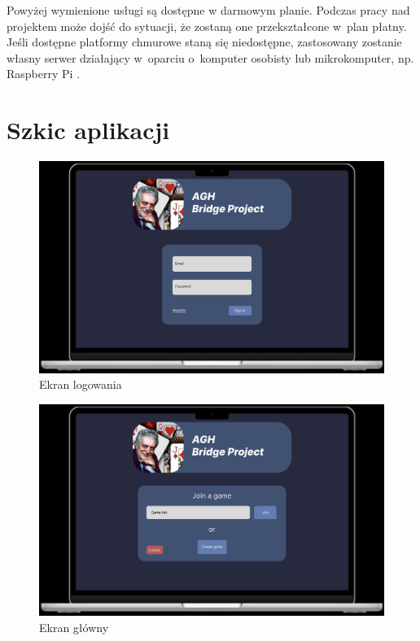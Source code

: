 Powyżej wymienione usługi są dostępne w darmowym planie.
Podczas pracy nad projektem może dojść do sytuacji, że
zostaną one przekształcone w~plan płatny.
Jeśli dostępne platformy chmurowe staną się niedostępne,
zastosowany zostanie własny serwer działający
w~oparciu o~komputer osobisty lub mikrokomputer, np. Raspberry Pi \cite{RPi}.


\section{Szkic aplikacji}


\begin{figure}[h]
  \centering
  \includegraphics[width=\textwidth]{img/figma-szkic/1.png}
  \caption{Ekran logowania}
\end{figure}

\begin{figure}[h]
  \centering
  \includegraphics[width=\textwidth]{img/figma-szkic/2.png}
  \caption{Ekran główny}
\end{figure}

